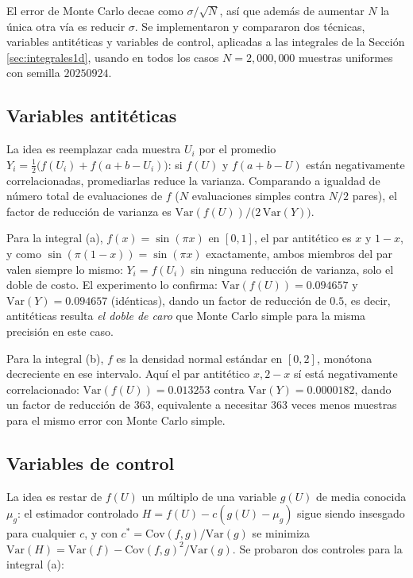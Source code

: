 \documentclass[11pt]{article}
\begin{document}
El error de Monte Carlo decae como $\sigma/\sqrt N$, así que además de aumentar $N$ la única otra vía es reducir $\sigma$. Se implementaron y compararon dos técnicas, variables antitéticas y variables de control, aplicadas a las integrales de la Sección \ref{sec:integrales1d}, usando en todos los casos $N=2{,}000{,}000$ muestras uniformes con semilla $20250924$.

\subsection{Variables antitéticas}

La idea es reemplazar cada muestra $U_i$ por el promedio $Y_i = \tfrac{1}{2}\big(f(U_i) + f(a+b-U_i)\big)$: si $f(U)$ y $f(a+b-U)$ están negativamente correlacionadas, promediarlas reduce la varianza. Comparando a igualdad de número total de evaluaciones de $f$ ($N$ evaluaciones simples contra $N/2$ pares), el factor de reducción de varianza es $\mathrm{Var}(f(U)) / \big(2\,\mathrm{Var}(Y)\big)$.

Para la integral (a), $f(x)=\sin(\pi x)$ en $[0,1]$, el par antitético es $x$ y $1-x$, y como $\sin(\pi(1-x)) = \sin(\pi x)$ exactamente, ambos miembros del par valen siempre lo mismo: $Y_i = f(U_i)$ sin ninguna reducción de varianza, solo el doble de costo. El experimento lo confirma: $\mathrm{Var}(f(U)) = 0.094657$ y $\mathrm{Var}(Y) = 0.094657$ (idénticas), dando un factor de reducción de $0.5$, es decir, antitéticas resulta \emph{el doble de caro} que Monte Carlo simple para la misma precisión en este caso.

Para la integral (b), $f$ es la densidad normal estándar en $[0,2]$, monótona decreciente en ese intervalo. Aquí el par antitético $x, 2-x$ sí está negativamente correlacionado: $\mathrm{Var}(f(U))=0.013253$ contra $\mathrm{Var}(Y)=0.0000182$, dando un factor de reducción de $363$, equivalente a necesitar 363 veces menos muestras para el mismo error con Monte Carlo simple.

\subsection{Variables de control}

La idea es restar de $f(U)$ un múltiplo de una variable $g(U)$ de media conocida $\mu_g$: el estimador controlado $H = f(U) - c(g(U)-\mu_g)$ sigue siendo insesgado para cualquier $c$, y con $c^* = \mathrm{Cov}(f,g)/\mathrm{Var}(g)$ se minimiza $\mathrm{Var}(H) = \mathrm{Var}(f) - \mathrm{Cov}(f,g)^2/\mathrm{Var}(g)$. Se probaron dos controles para la integral (a):
\end{document}
